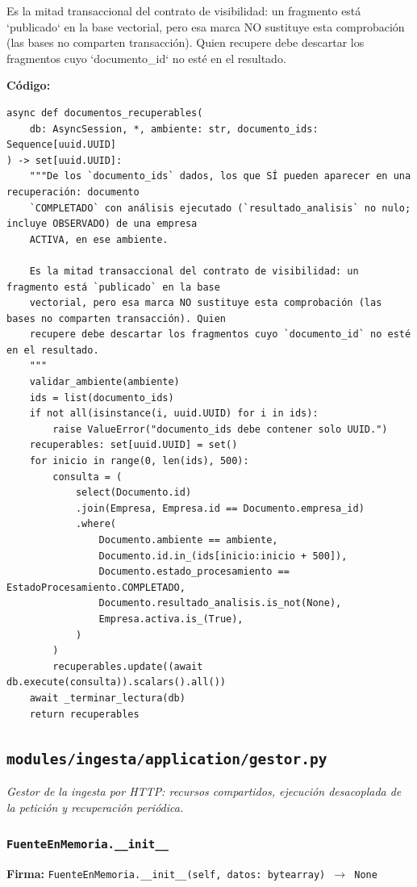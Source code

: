 \documentclass[11pt,a4paper]{article}
\begin{document}
Es la mitad transaccional del contrato de visibilidad: un fragmento está `publicado` en la base
vectorial, pero esa marca NO sustituye esta comprobación (las bases no comparten transacción). Quien
recupere debe descartar los fragmentos cuyo `documento\_id` no esté en el resultado.

\textbf{Código:}
\begin{lstlisting}
async def documentos_recuperables(
    db: AsyncSession, *, ambiente: str, documento_ids: Sequence[uuid.UUID]
) -> set[uuid.UUID]:
    """De los `documento_ids` dados, los que SÍ pueden aparecer en una recuperación: documento
    `COMPLETADO` con análisis ejecutado (`resultado_analisis` no nulo; incluye OBSERVADO) de una empresa
    ACTIVA, en ese ambiente.

    Es la mitad transaccional del contrato de visibilidad: un fragmento está `publicado` en la base
    vectorial, pero esa marca NO sustituye esta comprobación (las bases no comparten transacción). Quien
    recupere debe descartar los fragmentos cuyo `documento_id` no esté en el resultado.
    """
    validar_ambiente(ambiente)
    ids = list(documento_ids)
    if not all(isinstance(i, uuid.UUID) for i in ids):
        raise ValueError("documento_ids debe contener solo UUID.")
    recuperables: set[uuid.UUID] = set()
    for inicio in range(0, len(ids), 500):
        consulta = (
            select(Documento.id)
            .join(Empresa, Empresa.id == Documento.empresa_id)
            .where(
                Documento.ambiente == ambiente,
                Documento.id.in_(ids[inicio:inicio + 500]),
                Documento.estado_procesamiento == EstadoProcesamiento.COMPLETADO,
                Documento.resultado_analisis.is_not(None),
                Empresa.activa.is_(True),
            )
        )
        recuperables.update((await db.execute(consulta)).scalars().all())
    await _terminar_lectura(db)
    return recuperables
\end{lstlisting}

\subsection{\texttt{modules/ingesta/application/gestor.py}}
\textit{Gestor de la ingesta por HTTP: recursos compartidos, ejecución desacoplada de la petición y recuperación periódica.}

\subsubsection*{\texttt{FuenteEnMemoria.\_\_init\_\_}}
\textbf{Firma:} \texttt{FuenteEnMemoria.\_\_init\_\_(self, datos: bytearray) $\rightarrow$ None}
\end{document}
